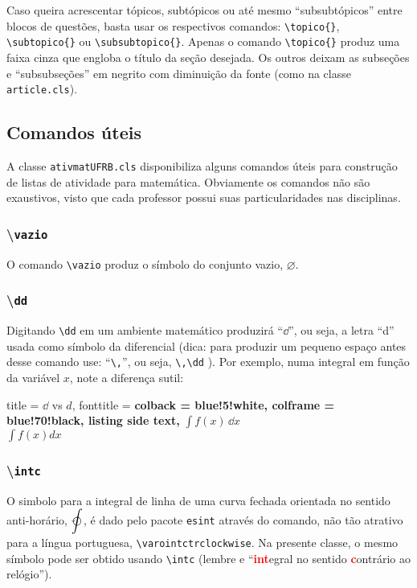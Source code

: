 Caso queira acrescentar tópicos, subtópicos ou até mesmo ``subsubtópicos'' 
entre blocos de questões, basta usar os respectivos comandos:
\verb|\topico{}|, \verb|\subtopico{}| ou \verb|\subsubtopico{}|.
Apenas o comando \verb|\topico{}| produz uma faixa cinza que engloba o título 
da seção desejada.
Os outros deixam as subseções e ``subsubseções'' em negrito com diminuição da
fonte (como na classe \verb|article.cls|).

\subsection{Comandos úteis}\label{comand}

A classe \texttt{ativmatUFRB.cls} disponibiliza alguns comandos úteis para 
construção de listas de atividade para matemática.
Obviamente os comandos não são exaustivos, visto que cada professor possui suas
particularidades nas disciplinas.
%
\subsubsection*{\textbackslash \texttt{vazio}} %
O comando \verb|\vazio| produz o símbolo do conjunto vazio, $\varnothing$.
%
\subsubsection*{\textbackslash \texttt{dd}} %
%
Digitando \verb|\dd| em um ambiente matemático produzirá ``$\dd$'', ou seja, a 
letra ``d'' usada como símbolo da diferencial (dica: para produzir um pequeno 
espaço antes desse comando use: ``\verb|\,|'', ou seja, \verb|\,\dd| ).
Por exemplo, numa integral em função da variável $x$, note a diferença sutil:

\begin{tcblisting}
{
  title     = $\dd$ vs $d$,
  fonttitle = \bfseries
  colback   = blue!5!white,
  colframe  = blue!70!black,
  listing side text, 
}
$\displaystyle \int f(x)\,\dd{x}$
\\
$\displaystyle \int f(x) dx$
\end{tcblisting}
%
\subsubsection*{\textbackslash \texttt{intc}} %
%
O simbolo para a integral de linha de uma curva fechada orientada no sentido 
anti-horário, $\displaystyle \intc$,  é dado pelo pacote \texttt{esint} através
do comando, não tão atrativo para a língua portuguesa, 
\verb|\varointctrclockwise|.
Na presente classe, o mesmo símbolo pode ser obtido usando \verb|\intc| (lembre
e ``\textcolor{red}{\textbf{int}}egral no sentido
\textcolor{red}{\textbf{c}}ontrário ao relógio'').
%
